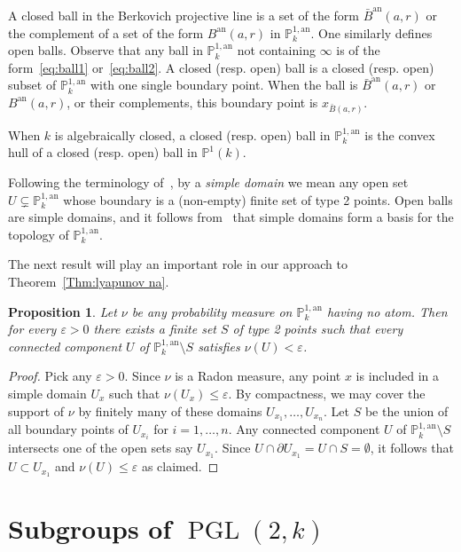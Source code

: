 \documentclass[11pt]{article}
\newtheorem{prop}[theo]{Proposition}
\theoremstyle{definition}
\numberwithin{equation}{section}
\numberwithin{figure}{section}
\numberwithin{table}{section}
\DeclareMathOperator{\PGL}{PGL}
\newcommand{\an}{\mathrm{an}}
\newcommand{\e}{\varepsilon}
\newcommand{\PP}{\mathbb{P}}
\newcommand{\berk}{{\mathbb{P}^{1, \mathrm{an}}_k}}
\newcommand{\PGLk}{\PGL(2, k)}
\begin{document}
A closed ball in the Berkovich projective line is a set of the form $\bar B^\an(a, r)$ or the complement of a set of the form $B^\an(a, r) $ in $\PP^{1, \an}_k$. One similarly defines open balls. Observe that any ball in $\PP^{1, \an}_k$ not containing $\infty$ is of the form~\eqref{eq:ball1} or~\eqref{eq:ball2}. A closed (resp. open) ball is a closed (resp. open) subset of $\PP^{1, \an}_k$ with one single boundary point. When the ball is $\bar B^\an(a, r) $ or $B^\an(a, r)$, or their complements, this boundary point is $x_{\bar{B}(a,r)}$.

When $k$ is algebraically closed, a closed (resp. open) ball in $\PP^{1, \an}_k$ is the convex hull of a closed (resp. open) ball in $\PP^1(k)$.


Following the terminology of~\cite{baker-rumely}, by a \emph{simple domain} we mean any open set $U\subsetneq \berk$ whose boundary is a (non-empty) finite set of type 2 points. Open balls are simple domains, and it follows from~\cite[Thm.~4.2.1]{berko} that simple domains form a basis for the topology of $\berk$.

The next result will play an important role in our approach to Theorem~\ref{Thm:lyapunov na}.

\begin{prop}\label{prop:subtree Hk}
Let $\nu$ be any probability measure on $\berk$ having no atom. Then for every $\e>0$ there exists a finite set $S$ of type 2 points such that every connected component $U$ of $\berk\setminus S$ satisfies $\nu(U)<\e$.
\end{prop}

\begin{proof}
Pick any $\e>0$. Since $\nu$ is a Radon measure, any point $x$ is included in a simple domain $U_x$ such that $\nu(U_x) \le \e$. By compactness, we may cover the support of $\nu$ by finitely many of these domains $U_{x_1}, \ldots, U_{x_n}$. Let $S$ be the union of all boundary points of $U_{x_i}$ for $i =1, \ldots,n$. Any connected component $U$ of $\berk\setminus S$ intersects one of the open sets say $U_{x_1}$. Since $U \cap \partial U_{x_1} = U\cap S = \emptyset$, it follows that $U\subset U_{x_1}$ and $\nu(U) \le \e$ as claimed.
\end{proof}


\section{Subgroups of \texorpdfstring{$\PGLk$}{PGLk}}\label{sec:subgroups}
\end{document}
